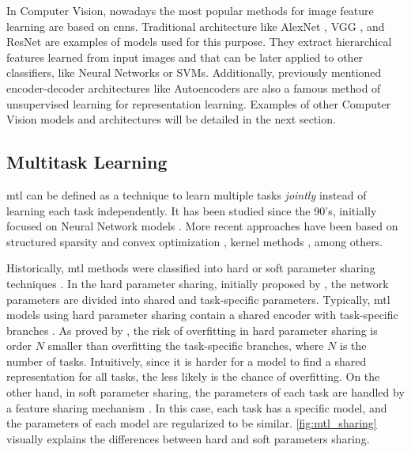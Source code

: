 In Computer Vision, nowadays the most popular methods for image feature learning are based on \aclp{cnn}. Traditional architecture like AlexNet \citep{krizhevsky2017imagenet}, VGG \citep{simonyan2014very}, and ResNet \citep{he2016deep} are examples of models used for this purpose. They extract hierarchical features learned from input images and that can be later applied to other classifiers, like Neural Networks or SVMs. Additionally, previously mentioned encoder-decoder architectures like Autoencoders are also a famous method of unsupervised learning for representation learning. Examples of other Computer Vision models and architectures will be detailed in the next section.

\subsection{Multitask Learning}

\acl{mtl} can be defined as a technique to learn multiple tasks \textit{jointly} instead of learning each task independently. It has been studied since the 90's, initially focused on Neural Network models \citep{ thrun1998learning, Caruana1997, baxter2000model}. More recent approaches have been based on structured sparsity and convex optimization \citep{argyriou2006multi}, kernel methods \citep{evgeniou2005learning}, among others.

Historically, \acs{mtl} methods were classified into hard or soft parameter sharing techniques \citep{vandenhende2021multi}. In the hard parameter sharing, initially proposed by \cite{Caruana1997}, the network parameters are divided into shared and task-specific parameters. Typically, \acs{mtl} models using hard parameter sharing contain a shared encoder with task-specific branches \citep{kendall2018multi, chen2018gradnorm, sener2018multi}. As proved by \cite{baxter1997bayesian}, the risk of overfitting in hard parameter sharing is order $N$ smaller than overfitting the task-specific branches, where $N$ is the number of tasks. Intuitively, since it is harder for a model to find a shared representation for all tasks, the less likely is the chance of overfitting. On the other hand, in soft parameter sharing, the parameters of each task are handled by a feature sharing mechanism \citep{ruder2019latent, gao2019nddr, liu2019end}. In this case, each task has a specific model, and the parameters of each model are regularized to be similar. \autoref{fig:mtl_sharing} visually explains the differences between hard and soft parameters sharing.

